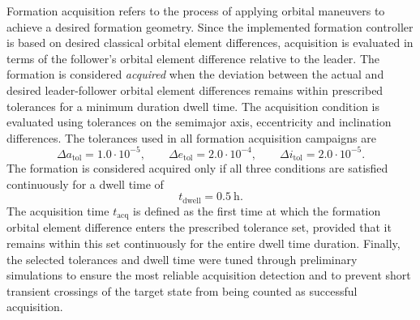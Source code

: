 Formation acquisition refers to the process of applying orbital maneuvers to achieve a desired formation geometry. Since the implemented formation controller is based on desired classical orbital element differences, acquisition is evaluated in terms of the follower's orbital element difference relative to the leader. The formation is considered \textit{acquired} when the deviation between the actual and desired leader-follower orbital element differences remains within prescribed tolerances for a minimum duration dwell time. The acquisition condition is evaluated using tolerances on the semimajor axis, eccentricity and inclination differences. The tolerances used in all formation acquisition campaigns are
\begin{equation}
\Delta a_{\mathrm{tol}} = 1.0 \cdot 10^{-5}, \qquad
\Delta e_{\mathrm{tol}} = 2.0 \cdot 10^{-4}, \qquad
\Delta i_{\mathrm{tol}} = 2.0 \cdot 10^{-5}.
\end{equation}
The formation is considered acquired only if all three conditions are satisfied continuously for a dwell time of
\begin{equation}
t_{\mathrm{dwell}} = 0.5~\mathrm{h}.
\end{equation}
The acquisition time $t_{\mathrm{acq}}$ is defined as the first time at which the formation orbital element difference enters the prescribed tolerance set, provided that it remains within this set continuously for the entire dwell time duration. Finally, the selected tolerances and dwell time were tuned through preliminary simulations to ensure the most reliable acquisition detection and to prevent short transient crossings of the target state from being counted as successful acquisition.

